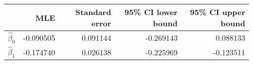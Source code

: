 \begin{tabular}{lrrrr}
\toprule
{} &       MLE &  Standard error &  95\% CI lower bound &  95\% CI upper bound \\
\midrule
$\hat\beta_0$ & -0.090505 &        0.091144 &            -0.269143 &             0.088133 \\
$\hat\beta_1$ & -0.174740 &        0.026138 &            -0.225969 &            -0.123511 \\
\bottomrule
\end{tabular}
